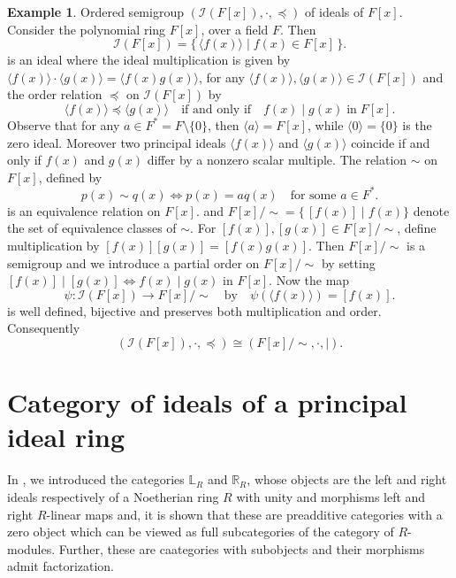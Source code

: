 \documentclass[12pt,a4paper]{amsart}
\theoremstyle{plain}
\theoremstyle{definition}
\newtheorem{example}[theorem]{Example}
\begin{document}
\begin{example}  Ordered semigroup $(\mathcal{I}(F[x]), \cdot , \preccurlyeq)$ of ideals of $F[x]$.\\

Consider the polynomial ring $F[x]$, over a field $F$. Then
\[
\mathcal{I}(F[x])
=
\{\, \langle f(x) \rangle \mid f(x) \in F[x] \,\}.
\]
is an ideal where the 
ideal multiplication is given by
$\langle f(x) \rangle \cdot \langle g(x) \rangle
= \langle f(x) g(x) \rangle $, for any $\langle f(x) \rangle, \langle g(x) \rangle \in \mathcal{I}(F[x])$
and the order relation $\preccurlyeq$ on $\mathcal{I}(F[x])$ by
\[
\langle f(x) \rangle \preccurlyeq \langle g(x) \rangle
\quad \text{if and only if} \quad
f(x) \mid g(x)\; \text{in}\; F[x]. 
\]
Observe that for any  $ a \in F^{*}  =F \setminus\{0\} $, then 
$\langle a \rangle = F[x]$, while $\langle 0 \rangle = \{0\}$ is the zero
ideal. Moreover two principal ideals $\langle f(x) \rangle$ and
$\langle g(x) \rangle$ coincide if and only if $f(x)$ and $g(x)$ differ by a
nonzero scalar multiple. 
The relation $\sim$ on  $F[x]$, defined by
\[
p(x) \sim q(x)
\iff
p(x) = a q(x) \quad \text{for some } a \in F^{*}.
\]
is an equivalence relation on $F[x]$. and $F[x]/\sim
= \{\, [f(x)] \mid f(x) \}$
denote the set of equivalence classes of $\sim$.
For $[f(x)], [g(x)] \in F[x]/\sim$, define multiplication by
$[f(x)] [g(x)] = [f(x) g(x)].$
Then $F[x]/\sim$ is a semigroup and we introduce a partial order on $F[x]/\sim$ by setting
$[f(x)] \mid [g(x)]
\iff
f(x) \mid g(x) \text{ in }F[x].$
Now the map
\[
\psi:\mathcal{I}(F[x])\longrightarrow F[x]/\sim
\quad \text{by} \quad
\psi(\langle f(x)\rangle)=[f(x)].
\]
is well defined, bijective and preserves both multiplication and
order. Consequently
\[
(\mathcal{I}(F[x]),\cdot,\preccurlyeq)
\cong
(F[x]/\sim,\cdot,\mid).
\]
\end{example}
\section{Category of ideals of a principal ideal ring}\label{pir}

In \cite{calcutta}, we introduced the categories $\mathbb{L}_R$ and $\mathbb{R}_R$, 
whose objects are the left and right ideals respectively of a Noetherian ring $R$ with unity and morphisms left and right $R$-linear maps and, it is  shown that these are 
preadditive categories with a zero object which can be viewed as full subcategories of the category of $R$-modules. Further, these are caategories with subobjects and their morphisms admit factorization. 
\end{document}

